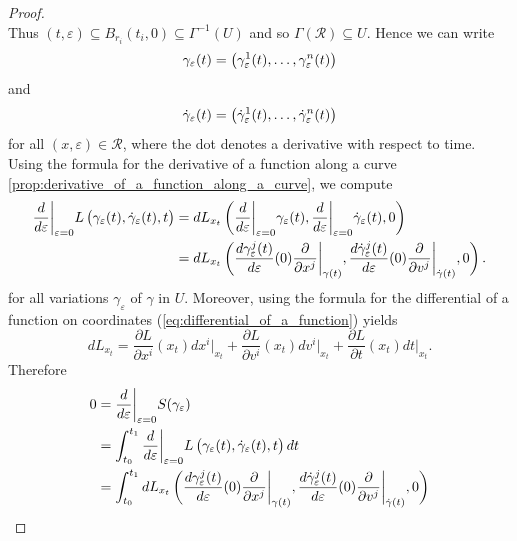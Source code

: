 \begin{proof}
\begin{equation*}
	\end{equation*}
	Thus $(t,\varepsilon) \subseteq B_{r_i}(t_i,0) \subseteq \Gamma^{-1}(U)$ and so $\Gamma(\mathcal{R}) \subseteq U$. Hence we can write
	\begin{equation*}
		\gamma_\varepsilon(t) = \del[1]{\gamma_\varepsilon^1(t),\dots,\gamma_\varepsilon^n(t)}
	\end{equation*}
	\noindent and 
	\begin{equation*}
		\dot{\gamma}_\varepsilon(t) = \del[1]{\dot{\gamma}_\varepsilon^1(t),\dots,\dot{\gamma}_\varepsilon^n(t)}
	\end{equation*}
	\noindent for all $(x,\varepsilon) \in \mathcal{R}$, where the dot denotes a derivative with respect to time.\\
	Using the formula for the derivative of a function along a curve \ref{prop:derivative_of_a_function_along_a_curve}, we compute
	\begin{align*}
		\frac{d}{d\varepsilon}\bigg\vert_{\varepsilon = 0} L\del[1]{\gamma_\varepsilon(t),\dot{\gamma}_\varepsilon(t),t} &= dL_{x_t}\del[3]{\frac{d}{d\varepsilon}\bigg\vert_{\varepsilon = 0}\gamma_\varepsilon(t),\frac{d}{d\varepsilon}\bigg\vert_{\varepsilon = 0}\dot{\gamma}_\varepsilon(t),0}\\
		&= dL_{x_t}\del[3]{\frac{d\gamma_\varepsilon^j(t)}{d\varepsilon}(0)\frac{\partial}{\partial x^j}\bigg\vert_{\gamma(t)},\frac{d\dot{\gamma}_\varepsilon^j(t)}{d\varepsilon}(0)\frac{\partial}{\partial v^j}\bigg\vert_{\dot{\gamma}(t)},0}.
	\end{align*}
	\noindent for all variations $\gamma_\varepsilon$ of $\gamma$ in $U$. Moreover, using the formula for the differential of a function on coordinates (\ref{eq:differential_of_a_function}) yields
	\begin{equation*}
		dL_{x_t} = \frac{\partial L}{\partial x^i}(x_t) dx^i\vert_{x_t} + \frac{\partial L}{\partial v^i}(x_t) dv^i\vert_{x_t} + \frac{\partial L}{\partial t}(x_t)dt\vert_{x_t}.
	\end{equation*}
	Therefore
	\begin{align*}
		0 &= \frac{d}{d\varepsilon}\bigg\vert_{\varepsilon = 0} S(\gamma_\varepsilon)\\
		&= \int_{t_0}^{t_1} \frac{d}{d\varepsilon}\bigg\vert_{\varepsilon = 0} L\del[1]{\gamma_\varepsilon(t),\dot{\gamma}_\varepsilon(t),t} dt\\
		&= \int_{t_0}^{t_1} dL_{x_t}\del[3]{\frac{d\gamma_\varepsilon^j(t)}{d\varepsilon}(0)\frac{\partial}{\partial x^j}\bigg\vert_{\gamma(t)},\frac{d\dot{\gamma}_\varepsilon^j(t)}{d\varepsilon}(0)\frac{\partial}{\partial v^j}\bigg\vert_{\dot{\gamma}(t)},0}\\

\end{align*}
\end{proof}

